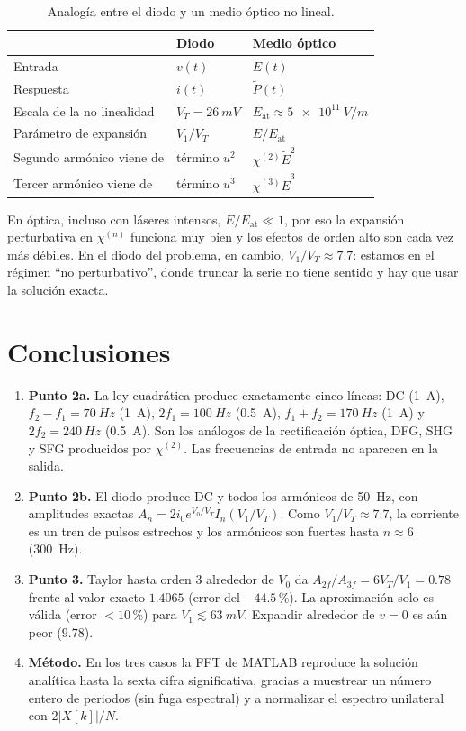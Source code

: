 \documentclass[11pt,letterpaper]{article}
\newcommand{\VT}{V_T}
\begin{document}
\begin{table}[h]
\centering
\caption{Analogía entre el diodo y un medio óptico no lineal.}
\begin{tabular}{@{}lll@{}}
\toprule
& Diodo & Medio óptico \\
\midrule
Entrada & $v(t)$ & $\tilde E(t)$ \\
Respuesta & $i(t)$ & $\tilde P(t)$ \\
Escala de la no linealidad & $\VT=\SI{26}{mV}$ & $E_{\text{at}}\approx\SI{5e11}{V/m}$ \\
Parámetro de expansión & $V_1/\VT$ & $E/E_{\text{at}}$ \\
Segundo armónico viene de & término $u^2$ & $\chi^{(2)}\tilde E^2$ \\
Tercer armónico viene de & término $u^3$ & $\chi^{(3)}\tilde E^3$ \\
\bottomrule
\end{tabular}
\end{table}

En óptica, incluso con láseres intensos, $E/E_{\text{at}}\ll1$, por eso la expansión perturbativa en
$\chi^{(n)}$ funciona muy bien y los efectos de orden alto son cada vez más débiles. En el diodo del
problema, en cambio, $V_1/\VT\approx7.7$: estamos en el régimen ``no perturbativo'', donde truncar la serie
no tiene sentido y hay que usar la solución exacta.

\section{Conclusiones}

\begin{enumerate}
  \item \textbf{Punto 2a.} La ley cuadrática produce exactamente cinco líneas: DC (\SI{1}{A}),
  $f_2-f_1=\SI{70}{Hz}$ (\SI{1}{A}), $2f_1=\SI{100}{Hz}$ (\SI{0.5}{A}), $f_1+f_2=\SI{170}{Hz}$
  (\SI{1}{A}) y $2f_2=\SI{240}{Hz}$ (\SI{0.5}{A}). Son los análogos de la rectificación óptica, DFG, SHG y SFG
  producidos por $\chi^{(2)}$. Las frecuencias de entrada no aparecen en la salida.
  \item \textbf{Punto 2b.} El diodo produce DC y todos los armónicos de \SI{50}{Hz}, con amplitudes exactas
  $A_n=2i_0e^{V_0/\VT}I_n(V_1/\VT)$. Como $V_1/\VT\approx7.7$, la corriente es un tren de pulsos estrechos y
  los armónicos son fuertes hasta $n\approx6$ (\SI{300}{Hz}).
  \item \textbf{Punto 3.} Taylor hasta orden 3 alrededor de $V_0$ da $A_{2f}/A_{3f}=6\VT/V_1=0.78$ frente al
  valor exacto $1.4065$ (error del $-44.5$\,\%). La aproximación solo es válida (error $<10$\,\%) para
  $V_1\lesssim\SI{63}{mV}$. Expandir alrededor de $v=0$ es aún peor ($9.78$).
  \item \textbf{Método.} En los tres casos la FFT de MATLAB reproduce la solución analítica hasta la sexta
  cifra significativa, gracias a muestrear un número entero de periodos (sin fuga espectral) y a normalizar
  el espectro unilateral con $2|X[k]|/N$.
\end{enumerate}
\end{document}
